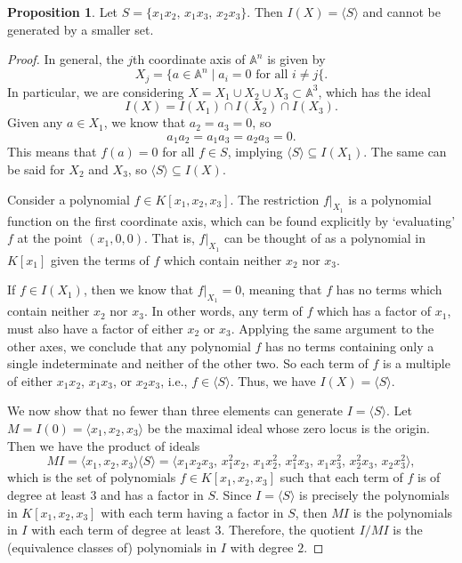 \documentclass[12pt]{article}
\theoremstyle{definition}
\newtheorem{proposition}{Proposition}
\newcommand{\<}{\langle}
\renewcommand{\>}{\rangle}
\newcommand{\A}{\mathbb{A}}
\renewcommand{\forall}{\text{ for all }}
\begin{document}
\begin{proposition}
    Let $S = \{x_1x_2,\, x_1x_3,\, x_2x_3\}$. Then $I(X) = \<S\>$ and cannot be generated by a smaller set.
\end{proposition}

\begin{proof}
    In general, the $j$th coordinate axis of $\A^n$ is given by
    \[
        X_j = \{a \in \A^n \mid a_i = 0 \forall i \ne j\{.
        \]
    In particular, we are considering $X = X_1 \cup X_2 \cup X_3 \subset \A^3$, which has the ideal
    \[
        I(X) = I(X_1) \cap I(X_2) \cap I(X_3).
    \]
    Given any $a \in X_1$, we know that $a_2 = a_3 = 0$, so
    \[
        a_1a_2 = a_1a_3 = a_2a_3 = 0.
    \]
    This means that $f(a) = 0$ for all $f \in S$, implying $\<S\> \subseteq I(X_1)$. The same can be said for $X_2$ and $X_3$, so $\<S\> \subseteq I(X)$.

    Consider a polynomial $f \in K[x_1, x_2, x_3]$. The restriction $f|_{X_1}$ is a polynomial function on the first coordinate axis, which can be found explicitly by `evaluating' $f$ at the point $(x_1, 0, 0)$. That is, $f|_{X_1}$ can be thought of as a polynomial in $K[x_1]$ given the terms of $f$ which contain neither $x_2$ nor $x_3$.

    If $f \in I(X_1)$, then we know that $f|_{X_1} = 0$, meaning that $f$ has no terms which contain neither $x_2$ nor $x_3$. In other words, any term of $f$ which has a factor of $x_1$, must also have a factor of either $x_2$ or $x_3$. Applying the same argument to the other axes, we conclude that any polynomial $f$ has no terms containing only a single indeterminate and neither of the other two. So each term of $f$ is a multiple of either $x_1x_2$, $x_1x_3$, or $x_2x_3$, i.e., $f \in \<S\>$. Thus, we have $I(X) = \<S\>$.

    We now show that no fewer than three elements can generate $I = \<S\>$. Let $M = I(0) = \<x_1, x_2, x_3\>$ be the maximal ideal whose zero locus is the origin. Then we have the product of ideals
    \[
        MI = \<x_1, x_2, x_3\>\<S\> = \<x_1x_2x_3,\, x_1^2x_2,\, x_1x_2^2,\, x_1^2x_3,\, x_1x_3^2,\, x_2^2x_3,\, x_2x_3^2\>,
    \]
    which is the set of polynomials $f \in K[x_1, x_2, x_3]$ such that each term of $f$ is of degree at least $3$ and has a factor in $S$. Since $I = \<S\>$ is precisely the polynomials in $K[x_1, x_2, x_3]$ with each term having a factor in $S$, then $MI$ is the polynomials in $I$ with each term of degree at least $3$. Therefore, the quotient $I/MI$ is the (equivalence classes of) polynomials in $I$ with degree $2$.
    

\end{proof}
\end{document}
